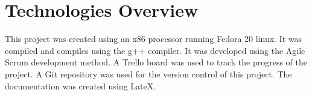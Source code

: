 \section{Technologies Overview}
This project was created using an x86 processor running Fedora 20 linux. It was
compiled and compiles using the g++ compiler. It was developed using the Agile
Scrum development method. A Trello board was used to track the progress of the
project. A Git repository was used for the version control of this project. The
documentation was created using LateX.
